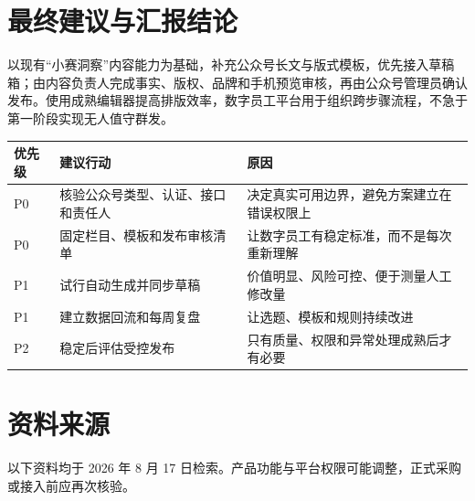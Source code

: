 \documentclass[UTF8,11pt,a4paper,fontset=none]{ctexart}
\begin{document}
\section{最终建议与汇报结论}

\begin{summarybox}[建议方案]
以现有“小赛洞察”内容能力为基础，补充公众号长文与版式模板，优先接入草稿箱；由内容负责人完成事实、版权、品牌和手机预览审核，再由公众号管理员确认发布。使用成熟编辑器提高排版效率，数字员工平台用于组织跨步骤流程，不急于第一阶段实现无人值守群发。
\end{summarybox}

\begin{tabularx}{\textwidth}{@{}C{12mm} L{42mm} Y@{}}
\toprule
\textbf{优先级} & \textbf{建议行动} & \textbf{原因} \\
\midrule
P0 & 核验公众号类型、认证、接口和责任人 & 决定真实可用边界，避免方案建立在错误权限上 \\
P0 & 固定栏目、模板和发布审核清单 & 让数字员工有稳定标准，而不是每次重新理解 \\
P1 & 试行自动生成并同步草稿 & 价值明显、风险可控、便于测量人工修改量 \\
P1 & 建立数据回流和每周复盘 & 让选题、模板和规则持续改进 \\
P2 & 稳定后评估受控发布 & 只有质量、权限和异常处理成熟后才有必要 \\
\bottomrule
\end{tabularx}

\clearpage
\section*{资料来源}

{\small 以下资料均于 2026 年 8 月 17 日检索。产品功能与平台权限可能调整，正式采购或接入前应再次核验。}
\end{document}
